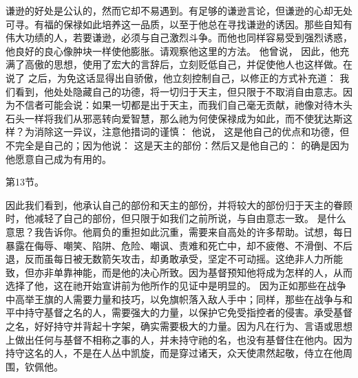 谦逊的好处是公认的，然而它却不易遇到。有足够的谦逊言论，但谦逊的心却无处可寻。有福的保禄如此培养这一品质，以至于他总在寻找谦逊的诱因。那些自知有伟大功绩的人，若要谦逊，必须与自己激烈斗争。而他也同样容易受到强烈诱惑，他良好的良心像肿块一样使他膨胀。请观察他这里的方法。 他曾说， 因此，他充满了高傲的思想，使用了宏大的言辞后，立刻贬低自己，并促使他人也这样做。在说了 之后，为免这话显得出自骄傲，他立刻控制自己，以修正的方式补充道： 我们看到，他处处隐藏自己的功德，将一切归于天主，但只限于不取消自由意志。因为不信者可能会说：如果一切都是出于天主，而我们自己毫无贡献，祂像对待木头石头一样将我们从邪恶转向爱智慧，那么祂为何使保禄成为如此，而不使犹达斯这样？为消除这一异议，注意他措词的谨慎： 他说， 这是他自己的优点和功德，但不完全是自己的；因为他说： 这是天主的部份：然后又是他自己的： 的确是因为他愿意自己成为有用的。\par

第13节。\par

因此我们看到，他承认自己的部份和天主的部份，并将较大的部份归于天主的眷顾时，他减轻了自己的部份，但只限于如我们之前所说，与自由意志一致。 是什么意思？我告诉你。他肩负的重担如此沉重，需要来自高处的许多帮助。试想，每日暴露在侮辱、嘲笑、陷阱、危险、嘲讽、责难和死亡中，却不疲倦、不滑倒、不后退，反而虽每日被无数箭矢攻击，却勇敢承受，坚定不可动摇。这绝非人力所能致，但亦非单靠神能，而是他的决心所致。因为基督预知他将成为怎样的人，从而选择了他，这在祂开始宣讲前为他所作的见证中是明显的。  因为正如那些在战争中高举王旗的人需要力量和技巧，以免旗帜落入敌人手中；同样，那些在战争与和平中持守基督之名的人，需要强大的力量，以保护它免受指控者的侵害。承受基督之名，好好持守并背起十字架，确实需要极大的力量。因为凡在行为、言语或思想上做出任何与基督不相称之事的人，并未持守祂的名，也没有基督住在他内。因为持守这名的人，不是在人丛中凯旋，而是穿过诸天，众天使肃然起敬，侍立在他周围，钦佩他。\par

